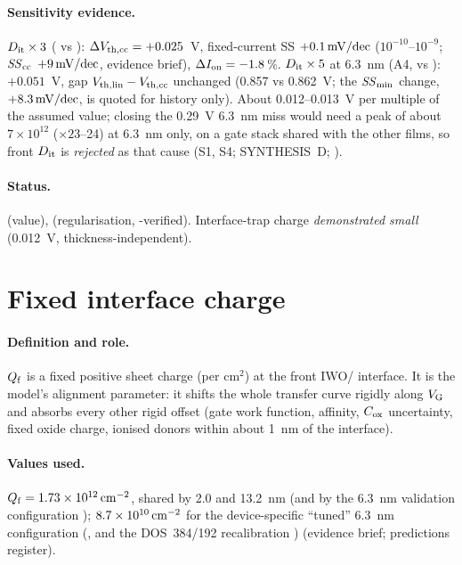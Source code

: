 \paragraph{Sensitivity evidence.}
$D_{\mathrm{it}}\times3$ ( vs ): $\Delta V_{\mathrm{th,cc}} = +0.025$~V, fixed-current SS $+0.1\,\mathrm{mV/dec}$ ($10^{-10}$--$10^{-9}$;
$\mathit{SS}_{\mathrm{cc}}$ $+9\,\mathrm{mV/dec}$, evidence brief), $\Delta I_{\mathrm{on}} = -1.8$\,\%. $D_{\mathrm{it}}\times5$ at 6.3~nm (A4,  vs ):
$+0.051$~V, gap $V_{\mathrm{th,lin}}-V_{\mathrm{th,cc}}$ unchanged (0.857 vs 0.862~V; the $\mathit{SS}_{\min}$ change, $+8.3\,\mathrm{mV/dec}$, is quoted for
history only). About 0.012--0.013~V per multiple of the assumed value; closing the 0.29~V 6.3~nm miss would need a
peak of about $7\times10^{12}$ ($\times23$--24) at 6.3~nm only, on a gate stack shared with the other films, so front
$D_{\mathrm{it}}$ is \emph{rejected} as that cause (S1, S4; SYNTHESIS~D; \evPOST).

\paragraph{Status.}
 (value),  (regularisation, \evNUM-verified). Interface-trap charge
\emph{demonstrated small} (0.012~V, thickness-independent).

\section{Fixed interface charge}
\label{sec:par-qf}

\paragraph{Definition and role.}
$Q_{\mathrm{f}}$ is a fixed positive sheet charge (per cm$^2$) at the front IWO/\AlO{} interface. It is the model's
alignment parameter: it shifts the whole transfer curve rigidly along $V_{\mathrm{G}}$ and absorbs every other rigid offset
(gate work function, affinity, $C_{\mathrm{ox}}$ uncertainty, fixed oxide charge, ionised donors within about 1~nm of the
interface).

\paragraph{Values used.}
$Q_{\mathrm{f}} = 1.73\times10^{12}\,\mathrm{cm}^{-2}$, shared by 2.0 and 13.2~nm (and by the 6.3~nm validation configuration
); $8.7\times10^{10}\,\mathrm{cm}^{-2}$ for the device-specific ``tuned'' 6.3~nm configuration (, and the
DOS~384/192 recalibration ) (evidence brief; predictions register).

